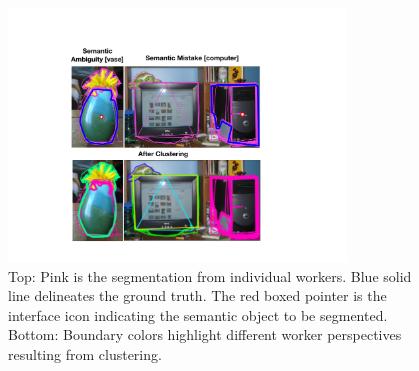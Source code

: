 \begin{figure}[h!]
    \centering
    \includegraphics[width=0.8\textwidth]{plots/semantic_error_clust.pdf}
    \caption{Top: Pink is the segmentation from individual workers. Blue solid line delineates the ground truth. The red boxed pointer is the interface icon indicating the semantic object to be segmented. Bottom: Boundary colors highlight different worker perspectives resulting from clustering.}
    \label{error_examples}
    \setlength{\abovecaptionskip}{-10pt}
    \setlength{\belowcaptionskip}{-5pt}
\end{figure}